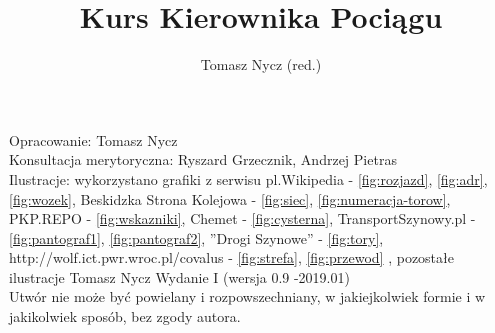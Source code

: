 \documentclass[usenames,dvipsnames,svgnames,table,a4paper,openany,justified]{tufte-book}
\author{Tomasz Nycz (red.)}
\title{Kurs Kierownika Pociągu}
\begin{document}
	\setlength{\parindent}{1cm} %
\restoregeometry %
\nopagecolor%

Opracowanie: Tomasz Nycz\\
Konsultacja merytoryczna: Ryszard Grzecznik, Andrzej Pietras\\
Ilustracje: wykorzystano grafiki z serwisu pl.Wikipedia - \ref{fig:rozjazd}, \ref{fig:adr}, \ref{fig:wozek}, Beskidzka Strona Kolejowa  - \ref{fig:siec}, \ref{fig:numeracja-torow}, PKP.REPO - \ref{fig:wskazniki}, Chemet - \ref{fig:cysterna}, TransportSzynowy.pl - \ref{fig:pantograf1}, \ref{fig:pantograf2}, ''Drogi Szynowe'' - \ref{fig:tory}, http://wolf.ict.pwr.wroc.pl/covalus - \ref{fig:strefa}, \ref{fig:przewod} , pozostałe ilustracje Tomasz Nycz
\vfill
Wydanie I (wersja 0.9 -2019.01)\\
Utwór nie może być powielany i rozpowszechniany, w jakiejkolwiek formie
i w jakikolwiek sposób, bez zgody autora. 
\end{document}
